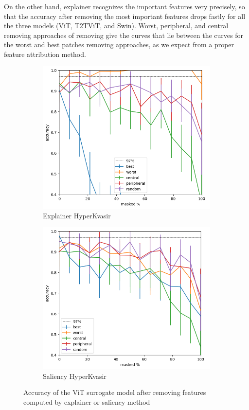 \documentclass[magisterska,en]{pracamgr}
\begin{document}
On the other hand, explainer recognizes the important features very precisely, so that the accuracy after removing the most important features drops fastly for all the three models (ViT, T2T\textunderscore ViT, and Swin). Worst, peripheral, and central removing approaches of removing give the curves that lie between the curves for the worst and best patches removing approaches, as we expect from a proper feature attribution method.








\begin{figure}
\centering
\begin{subfigure}{.6\textwidth}
  \centering
  \includegraphics[width=.6\linewidth]{./images/vit_gastro_masking_explainer_patches_accuracy_half-0.png}
  \caption{Explainer HyperKvasir}
  \label{fig:sub1}
\end{subfigure}%
\begin{subfigure}{.6\textwidth}
  \centering
  \includegraphics[width=.6\linewidth]
{./images/vit_gastro_masking_saliency_patches_accuracy_half-0.png}
  \caption{Saliency HyperKvasir}
  \label{fig:sub2}
\end{subfigure}
\caption{Accuracy of the ViT surrogate model after removing features computed by explainer or saliency method}
\label{fig:ViT_Saliency_Explainer_HyperKvasir}
\end{figure}
\end{document}
